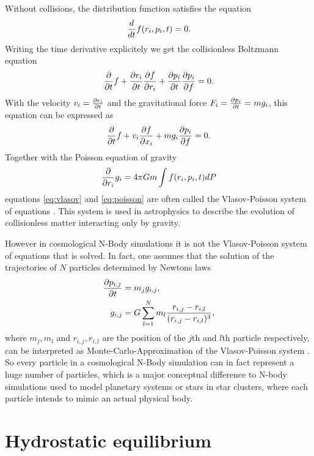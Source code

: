 Without collisions, the distribution function satisfies the
equation
\begin{align}
\td{t} f(r_i,p_i,t) = 0.
\end{align}
Writing the time derivative explicitely we get the collisionless Boltzmann
equation
\begin{align}
\pd{t}f + \ppd{t}{r_i}\ppd{r_i}{f}+\ppd{t}{p_i}\ppd{f}{p_i} = 0.
\end{align}
With the velocity $v_i=\ppd{t}{r_i}$ and the gravitational force
$F_i=\ppd{t}{p_i}=m g_i$, this equation can be expressed as
\begin{align}
\pd{t}f + v_i \ppd{x_i}{f}+m g_i \ppd{f}{p_i} = 0. \label{eq:vlasov}
\end{align}
Together with the Poisson equation of gravity
\begin{align}
\pd{r_i} g_i = 4 \pi G m \int f(r_i,p_i,t) dP \label{eq:poisson}
\end{align}
equations \ref{eq:vlasov} and \ref{eq:poisson} are often called the
Vlasov-Poisson system of equations \citep{Peebles1980}. This system is used in
astrophysics to describe the evolution of collisionless matter interacting only
by gravity.

However in cosmological N-Body simulations it is not the Vlasov-Poisson system
of equations that is solved. In fact, one assumes that the solution of the
trajectories of $N$ particles determined by Newtons laws
\begin{align}
\ppd{t}{p_{i,j}} &= m_j g_{i,j},\\
g_{i,j} &= G \sum_{l=1}^N m_l \frac{r_{i,j}-r_{i,l}}{(r_{i,j}-r_{i,l})^3},
\end{align}
where $m_j,m_l$ and $r_{i,j},r_{i,l}$ are the position of the $j$th and
 $l$th particle respectively, can be 
interpreted as Monte-Carlo-Approximation of the Vlasov-Poisson system
\citep{Steinmetz1999}. So every particle in a cosmological N-Body simulation
can in fact represent a huge number of particles, which is a major
conceptual
difference to N-body simulations used to model planetary systems or stars in
star clusters, where each particle intends to mimic an actual physical body.

\chapter{Hydrostatic equilibrium}\label{stat}
